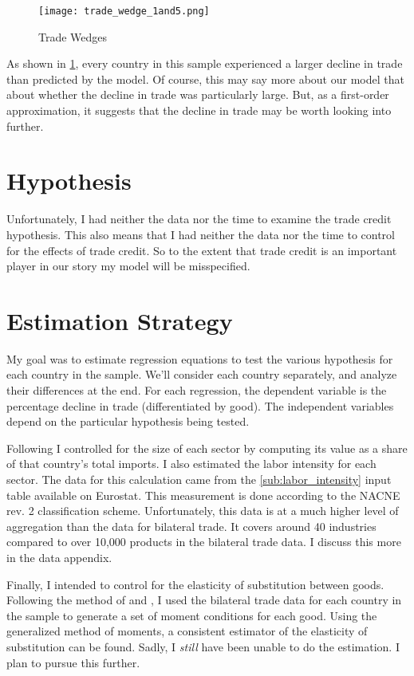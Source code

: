 \documentclass[11pt]{article}
\begin{document}
  \begin{figure} \label{fig:trade_wedge}
    \centering
      \texttt{[image: trade\_wedge\_1and5.png]}
    \caption{Trade Wedges}
  \end{figure}

  As shown in \ref{fig:trade_wedge}, every country in this sample experienced a larger decline in trade than predicted by the model.  Of course, this may say more about our model that about whether the decline in trade was particularly large.  But, as a first-order approximation, it suggests that the decline in trade may be worth looking into further.

\section{Hypothesis}
\label{sec:hypothesis}
  Unfortunately, I had neither the data nor the time to examine the trade credit hypothesis.  This also means that I had neither the data nor the time to control for the effects of trade credit.  So to the extent that trade credit is an important player in our story my model will be misspecified.

\section{Estimation Strategy} %
\label{sec:estimation_strategy}
  My goal was to estimate regression equations to test the various hypothesis for each country in the sample.  We'll consider each country separately, and analyze their differences at the end.  For each regression, the dependent variable is the percentage decline in trade (differentiated by good).  The independent variables depend on the particular hypothesis being tested.

  Following \cite{llt:2010} I controlled for the size of each sector by computing its value as a share of that country's total imports. I also estimated the labor intensity for each sector.  The data for this calculation came from the \ref{sub:labor_intensity} input table available on Eurostat.  This measurement is done according to the NACNE rev. 2 classification scheme.  Unfortunately, this data is at a much higher level of aggregation than the data for bilateral trade.  It covers around 40 industries compared to over 10,000 products in the bilateral trade data.  I discuss this more in the data appendix.

  Finally, I intended to control for the elasticity of substitution between goods.  Following the method of \cite{weinstein-broda:2004} and \cite{feenstra:1994}, I used the bilateral trade data for each country in the sample to generate a set of moment conditions for each good.  Using the generalized method of moments, a consistent estimator of the elasticity of substitution can be found. Sadly, I \emph{still} have been unable to do the estimation.  I plan to pursue this further.
\end{document}
